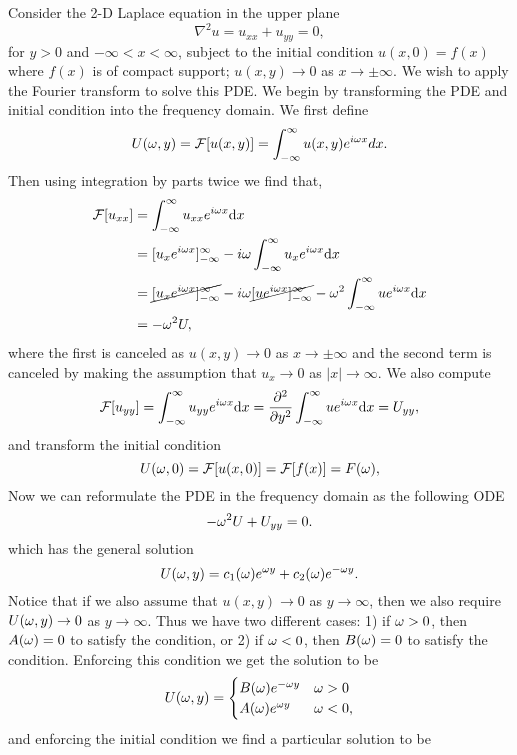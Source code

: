 \documentclass[12pt]{report}
\begin{document}
\begin{solution}

    \noindent
    Consider the 2-D Laplace equation in the upper plane
    \[ 
        \nabla^2 u = u_{xx} + u_{yy} = 0,
    \]
    for $y > 0$ and $-\infty < x < \infty$, subject to the initial condition $u(x,0) = f(x)$ where $f(x)$ is of compact support; $u(x,y) \to 0$ as $x \to \pm \infty$. We wish to apply the Fourier transform to solve this PDE. We begin by transforming the PDE and initial condition into the frequency domain. We first define
    \[ 
        U({\omega},y) = {\mathcal{F}}[u(x,y)] = \int_{-\infty}^{\infty}u(x,y)e^{i{\omega} x}dx.
    \]  
    Then using integration by parts twice we find that,
    \begin{align*}
        {\mathcal{F}}[u_{xx}] &= \int_{-\infty}^{\infty}u_{xx}e^{i{\omega} x}{\mathrm{d}} x\\
        &= [u_x e^{i{\omega} x}]_{-\infty}^{\infty} - i{\omega} \int_{-\infty}^{\infty} u_x e^{i{\omega} x}{\mathrm{d}} x\\
        &= \cancel{[u_x e^{i{\omega} x}]_{-\infty}^{\infty}} - i{\omega} \cancel{[ue^{i{\omega} x}]_{-\infty}^\infty} - {\omega}^2 \int_{-\infty}^{\infty} u e^{i {\omega} x}{\mathrm{d}} x\\
        &= -{\omega}^2 U,
    \end{align*}
    where the first is canceled as $u(x,y) \to 0$ as $x \to \pm \infty$ and the second term is canceled by making the assumption that $u_x \to 0$ as $|x| \to \infty$. We also compute
    \[ 
        {\mathcal{F}}[u_{yy}] = \int_{-\infty}^{\infty} u_{yy}e^{i{\omega} x}{\mathrm{d}} x = \frac{\partial^{2} }{\partial y^{2}}\int_{-\infty}^{\infty}ue^{i{\omega} x} {\mathrm{d}} x = U_{yy},
    \]
    and transform the initial condition
    \[ 
        U({\omega}, 0) = {\mathcal{F}}[u(x,0)] = {\mathcal{F}}[f(x)] = F({\omega}),
    \]
    Now we can reformulate the PDE in the frequency domain as the following ODE
        \[ 
            -{\omega}^2 U + U_{yy} = 0.
        \]
    which has the general solution
    \[ 
        U({\omega},y) = c_1({\omega})e^{{\omega} y} + c_2({\omega})e^{-{\omega} y}.
    \]
    Notice that if we also assume that $u(x,y) \to 0$ as $y \to \infty$, then we also require $U({\omega},y) \to 0$ as $y \to \infty$. Thus we have two different cases: 1) if ${\omega} > 0$, then $A({\omega}) = 0$ to satisfy the condition, or 2) if ${\omega} < 0$, then $B({\omega}) = 0$ to satisfy the condition. Enforcing this condition we get the solution to be 
    \[
        U({\omega},y) = \begin{cases}
            B({\omega})e^{-{\omega} y} &{\omega}>0\\
            A({\omega})e^{{\omega} y} &{\omega}<0,
        \end{cases}
    \]
    and enforcing the initial condition we find a particular solution to be

\end{solution}
\end{document}
